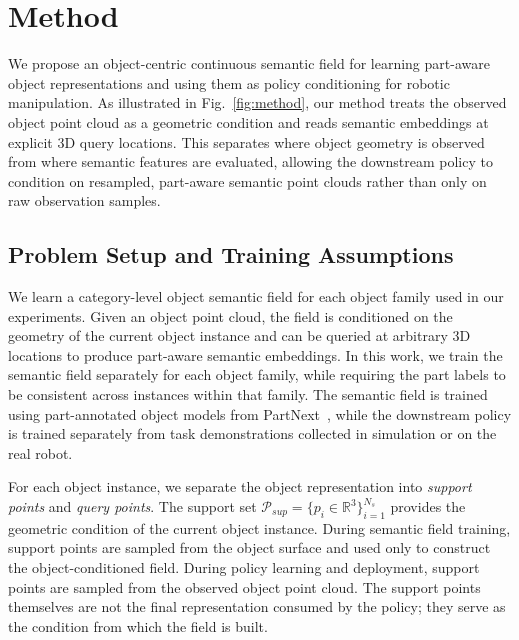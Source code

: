  \section{Method}

We propose an object-centric continuous semantic field for learning part-aware object representations and using them as policy conditioning for robotic manipulation. As illustrated in Fig.~\ref{fig:method}, our method treats the observed object point cloud as a geometric condition and reads semantic embeddings at explicit 3D query locations. This separates where object geometry is observed from where semantic features are evaluated, allowing the downstream policy to condition on resampled, part-aware semantic point clouds rather than only on raw observation samples.

 \subsection{Problem Setup and Training Assumptions}

We learn a category-level object semantic field for each object family used in our experiments. Given an object point cloud, the field is conditioned on the geometry of the current object instance and can be queried at arbitrary 3D locations to produce part-aware semantic embeddings. In this work, we train the semantic field separately for each object family, while requiring the part labels to be consistent across instances within that family. The semantic field is trained using part-annotated object models from PartNext~\cite{wang2026partnext}, while the downstream policy is trained separately from task demonstrations collected in simulation or on the real robot.

For each object instance, we separate the object representation into \emph{support points} and \emph{query points}. The support set $\mathcal{P}_{sup}=\{p_i\in\mathbb{R}^3\}_{i=1}^{N_s}$ provides the geometric condition of the current object instance. During semantic field training, support points are sampled
from the object surface and used only to construct the object-conditioned field. During policy learning and deployment, support points are sampled from the observed object point cloud. The support points themselves are not the final representation consumed by the policy; they serve as the condition from which the field is built.


